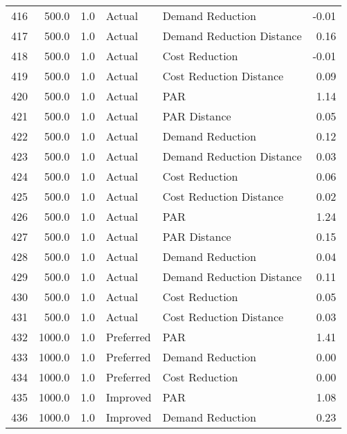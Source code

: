\begin{longtable}{lrrllr}
416  &        500.0 &     1.0 &         Actual &           Demand Reduction &  -0.01 \\
417  &        500.0 &     1.0 &         Actual &  Demand Reduction Distance &   0.16 \\
418  &        500.0 &     1.0 &         Actual &             Cost Reduction &  -0.01 \\
419  &        500.0 &     1.0 &         Actual &    Cost Reduction Distance &   0.09 \\
420  &        500.0 &     1.0 &         Actual &                        PAR &   1.14 \\
421  &        500.0 &     1.0 &         Actual &               PAR Distance &   0.05 \\
422  &        500.0 &     1.0 &         Actual &           Demand Reduction &   0.12 \\
423  &        500.0 &     1.0 &         Actual &  Demand Reduction Distance &   0.03 \\
424  &        500.0 &     1.0 &         Actual &             Cost Reduction &   0.06 \\
425  &        500.0 &     1.0 &         Actual &    Cost Reduction Distance &   0.02 \\
426  &        500.0 &     1.0 &         Actual &                        PAR &   1.24 \\
427  &        500.0 &     1.0 &         Actual &               PAR Distance &   0.15 \\
428  &        500.0 &     1.0 &         Actual &           Demand Reduction &   0.04 \\
429  &        500.0 &     1.0 &         Actual &  Demand Reduction Distance &   0.11 \\
430  &        500.0 &     1.0 &         Actual &             Cost Reduction &   0.05 \\
431  &        500.0 &     1.0 &         Actual &    Cost Reduction Distance &   0.03 \\
432  &       1000.0 &     1.0 &      Preferred &                        PAR &   1.41 \\
433  &       1000.0 &     1.0 &      Preferred &           Demand Reduction &   0.00 \\
434  &       1000.0 &     1.0 &      Preferred &             Cost Reduction &   0.00 \\
435  &       1000.0 &     1.0 &       Improved &                        PAR &   1.08 \\
436  &       1000.0 &     1.0 &       Improved &           Demand Reduction &   0.23 \\

\end{longtable}

